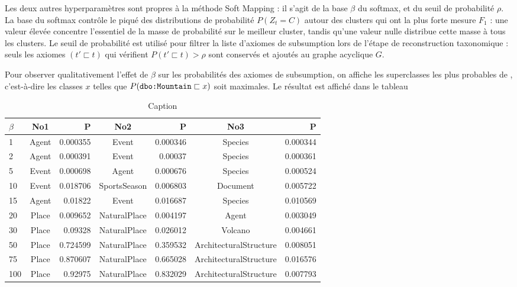 Les deux autres hyperparamètres sont propres à la méthode Soft Mapping : il s'agit de la base $\beta$ du softmax, et du seuil de probabilité $\rho$. La base du softmax contrôle le piqué des distributions de probabilité $P(Z_t = C)$ autour des clusters qui ont la plus forte mesure $F_1$ : une valeur élevée concentre l'essentiel de la masse de probabilité sur le meilleur cluster, tandis qu'une valeur nulle distribue cette masse à tous les clusters. Le seuil de probabilité est utilisé pour filtrer la liste d'axiomes de subsumption lors de l'étape de reconstruction taxonomique : seuls les axiomes $(t' \sqsubset t)$ qui vérifient $P(t' \sqsubset t) > \rho$ sont conservés et ajoutés au graphe acyclique $G$.

Pour observer qualitativement l'effet de $\beta$ sur les probabilités des axiomes de subsumption, on affiche les superclasses les plus probables de , c'est-à-dire les classes $x$ telles que  $P(\texttt{dbo:Mountain} \sqsubset x)$ soit maximales. Le résultat est affiché dans le tableau

\begin{table}[h]
    \centering
    \begin{tabular}{|l|cr|cr|cr|}
    \hline
$\beta$	&	No1	&	P	&	No2	&	P	&	No3	&	P  \\ 
\hline
1	&	Agent	&	0.000355	&	Event	&	0.000346	&	Species	&	0.000344  \\ 
2	&	Agent	&	0.000391	&	Event	&	0.00037	&	Species	&	0.000361  \\ 
5	&	Event	&	0.000698	&	Agent	&	0.000676	&	Species	&	0.000524  \\ 
10	&	Event	&	0.018706	&	SportsSeason	&	0.006803	&	Document	&	0.005722  \\ 
15	&	Agent	&	0.01822	&	Event	&	0.016687	&	Species	&	0.010569  \\ 
20	&	Place	&	0.009652	&	NaturalPlace	&	0.004197	&	Agent	&	0.003049  \\ 
30	&	Place	&	0.09328	&	NaturalPlace	&	0.026012	&	Volcano	&	0.004661  \\ 
50	&	Place	&	0.724599	&	NaturalPlace	&	0.359532	&	ArchitecturalStructure	&	0.008051  \\ 
75	&	Place	&	0.870607	&	NaturalPlace	&	0.665028	&	ArchitecturalStructure	&	0.016576  \\ 
100	&	Place	&	0.92975	&	NaturalPlace	&	0.832029	&	ArchitecturalStructure	&	0.007793   \\ 
\hline
    \end{tabular}
    \caption{Caption}
    \label{tab:my_label}
\end{table}


